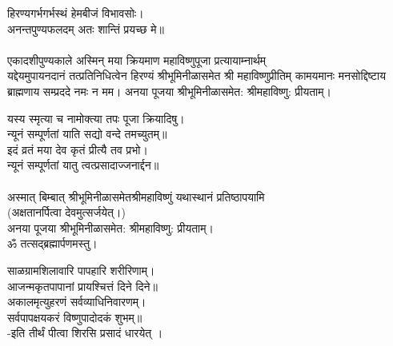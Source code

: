 हिरण्यगर्भगर्भस्थं हेमबीजं विभावसोः।\\
अनन्तपुण्यफलदम् अतः शान्तिं प्रयच्छ मे॥\\
 \\
एकादशीपुण्यकाले अस्मिन् मया क्रियमाण महाविष्णुपूजा प्रत्यायाम्नार्थम्\\
यद्देयमुपायनदानं तत्प्रतिनिधित्वेन हिरण्यं श्रीभूमिनीळासमेत श्री महाविष्णुप्रीतिम् 
कामयमानः मनसोद्दिष्टाय ब्राह्मणाय सम्प्रददे नमः न मम। 
अनया पूजया श्रीभूमिनीळासमेत: श्रीमहाविष्णु: प्रीयताम्। 
 
 यस्य स्मृत्या च नामोक्त्या तपः पूजा क्रियादिषु।\\
न्यूनं सम्पूर्णतां याति सद्यो वन्दे तमच्युतम्॥ \\
इदं व्रतं मया देव कृतं प्रीत्यै तव प्रभो।\\
न्यूनं सम्पूर्णतां यातु त्वत्प्रसादाज्जनार्द्दन॥\\
 \\
अस्मात् बिम्बात् श्रीभूमिनीळासमेतश्रीमहाविष्णुं यथास्थानं प्रतिष्ठापयामि\\
(अक्षतानर्पित्वा देवमुत्सर्जयेत्।)\\
अनया पूजया श्रीभूमिनीळासमेत: श्रीमहाविष्णु: प्रीयताम्। \\
ॐ तत्सद्ब्रह्मार्पणमस्तु।
 
साळग्रामशिलावारि पापहारि शरीरिणाम्।\\
आजन्मकृतपापानां प्रायश्चित्तं दिने दिने॥\\
अकालमृत्युहरणं सर्वव्याधिनिवारणम्।\\
सर्वपापक्षयकरं विष्णुपादोदकं शुभम्॥ \\
 -इति तीर्थं पीत्वा शिरसि प्रसादं धारयेत् ।
